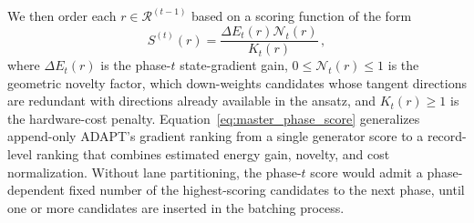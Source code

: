 \documentclass[
  reprint,
  amsmath,
  amssymb,
  aps,
  pra,
  nofootinbib,
  superscriptaddress,
  floatfix
]{revtex4-2}
\begin{document}
We then order each \(r\in\mathcal R^{(t-1)}\) based on a scoring function of the form
\begin{equation}
S^{(t)}(r)
=
\frac{\Delta E_t(r)\mathcal N_t(r)}{K_t(r)}\,,
\label{eq:master_phase_score}
\end{equation}
where \(\Delta E_t(r)\) is the phase-\(t\) state-gradient gain,
\(0\leq\mathcal N_t(r)\leq 1\) is the geometric novelty factor, which
down-weights candidates whose tangent directions are redundant with directions
already available in the ansatz, and \(K_t(r)\geq 1\) is the hardware-cost
penalty. Equation~\eqref{eq:master_phase_score} generalizes append-only
ADAPT's gradient ranking from a single generator score to a record-level
ranking that combines estimated energy gain, novelty, and cost normalization.
Without lane partitioning, the phase-\(t\) score would admit a phase-dependent
fixed number of the highest-scoring candidates to the next phase, until one or
more candidates are inserted in the batching process.
\end{document}
